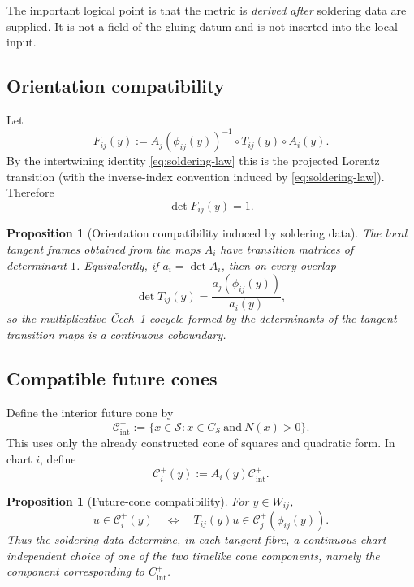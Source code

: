 \documentclass[11pt,a4paper]{article}
\newtheorem{proposition}[theorem]{Proposition}
\theoremstyle{definition}
\theoremstyle{remark}
\newcommand{\Smodel}{\mathcal{S}}
\newcommand{\Cech}{\ifmmode\text{\v{C}ech}\else\v{C}ech\fi}
\begin{document}
The important logical point is that the metric is \emph{derived after} soldering data are supplied.  It is not a field of the gluing datum and is not
inserted into the local input.

\subsection{Orientation compatibility}

Let
\[
   F_{ij}(y)
   :=
   A_j(\phi_{ij}(y))^{-1}
   \circ T_{ij}(y)\circ A_i(y).
\tag{8.3}
\]
By the intertwining identity \eqref{eq:soldering-law} this is the projected Lorentz transition (with the inverse-index convention induced by
\eqref{eq:soldering-law}).  Therefore
\[
   \det F_{ij}(y)=1.
\tag{8.4}
\]

\begin{proposition}[Orientation compatibility induced by soldering data]
\label{prop:orientation-reduction}
The local tangent frames obtained from the maps \(A_i\) have transition matrices
of determinant \(1\).  Equivalently, if \(a_i=\det A_i\), then on every overlap
\[
   \det T_{ij}(y)=\frac{a_j(\phi_{ij}(y))}{a_i(y)},
\]
so the multiplicative \Cech\ 1-cocycle formed by the determinants of the tangent transition maps is a continuous coboundary.
\end{proposition}

\subsection{Compatible future cones}

Define the interior future cone by
\[
   \mathcal C^{+}_{\mathrm{int}}
   :=
   \{x\in\Smodel : x\in C_{\Smodel}\ \text{and}\ N(x)>0\}.
\]
This uses only the already constructed cone of squares and quadratic
form.  In chart \(i\), define
\[
   \mathcal C^{+}_{i}(y)
   :=
   A_i(y)\mathcal C^{+}_{\mathrm{int}}.
\tag{8.5}
\]

\begin{proposition}[Future-cone compatibility]
\label{prop:future-cone}
For \(y\in W_{ij}\),
\[
   u\in\mathcal C^{+}_{i}(y)
   \quad\Longleftrightarrow\quad
   T_{ij}(y)u
   \in
   \mathcal C^{+}_{j}(\phi_{ij}(y)).
\tag{8.6}\label{eq:future-cone-transform}
\]
Thus the soldering data determine, in each tangent fibre, a continuous chart-independent choice of one of the two timelike cone components, namely the component corresponding to \(C^{+}_{\mathrm{int}}\).
\end{proposition}
\end{document}
